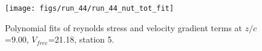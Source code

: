 \begin{figure}[H]
\centering
\texttt{[image: figs/run\_44/run\_44\_nut\_tot\_fit]}
\caption{Polynomial fits of reynolds stress and velocity gradient terms at $z/c$=9.00, $V_{free}$=21.18, station 5.}
\label{fig:run_44_nut_tot_fit}
\end{figure}


